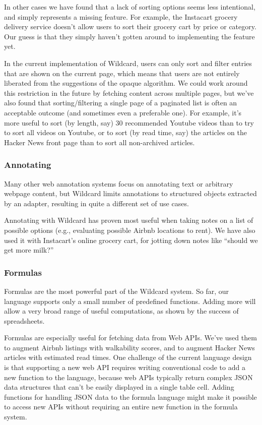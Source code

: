 \documentclass[sigplan,screen,10pt,anonymous,review]{acmart}
\begin{document}
In other cases we have found that a lack of sorting options seems less
intentional, and simply represents a missing feature. For example, the
Instacart grocery delivery service doesn't allow users to sort their
grocery cart by price or category. Our guess is that they simply haven't
gotten around to implementing the feature yet.

In the current implementation of Wildcard, users can only sort and
filter entries that are shown on the current page, which means that
users are not entirely liberated from the suggestions of the opaque
algorithm. We could work around this restriction in the future by
fetching content across multiple pages, but we've also found that
sorting/filtering a single page of a paginated list is often an
acceptable outcome (and sometimes even a preferable one). For example,
it's more useful to sort (by length, say) 30 recommended Youtube videos
than to try to sort all videos on Youtube, or to sort (by read time,
say) the articles on the Hacker News front page than to sort all
non-archived articles.

\hypertarget{annotating}{%
\subsubsection{Annotating}\label{annotating}}

Many other web annotation systems focus on annotating text or arbitrary
webpage content, but Wildcard limits annotations to structured objects
extracted by an adapter, resulting in quite a different set of use
cases.

Annotating with Wildcard has proven most useful when taking notes on a
list of possible options (e.g., evaluating possible Airbnb locations to
rent). We have also used it with Instacart's online grocery cart, for
jotting down notes like ``should we get more milk?''

\hypertarget{formulas}{%
\subsubsection{Formulas}\label{formulas}}

Formulas are the most powerful part of the Wildcard system. So far, our
language supports only a small number of predefined functions. Adding
more will allow a very broad range of useful computations, as shown by
the success of spreadsheets.

Formulas are especially useful for fetching data from Web APIs. We've
used them to augment Airbnb listings with walkability scores, and to
augment Hacker News articles with estimated read times. One challenge of
the current language design is that supporting a new web API requires
writing conventional code to add a new function to the language, because
web APIs typically return complex JSON data structures that can't be
easily displayed in a single table cell. Adding functions for handling
JSON data to the formula language might make it possible to access new
APIs without requiring an entire new function in the formula system.
\end{document}
